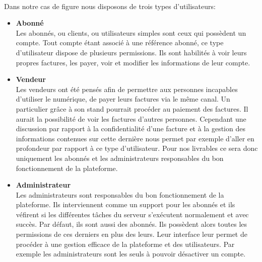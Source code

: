       \paragraph{}
      Dans notre cas de figure nous disposons de trois types d'utilisateurs:
	\begin{itemize}
	
	  \item \textbf{Abonn\'e}
	    \\Les abonn\'es, ou clients, ou utilisateurs simples sont ceux qui poss\`edent un compte. Tout compte \'etant associ\'e \`a une r\'ef\'erence abonn\'e, ce type d'utilisateur dispose de plusieurs permissions. Ils sont habilit\'es \`a voir leurs propres factures, les payer, voir et modifier les informations de leur compte.
	  
	  \item \textbf{Vendeur}
	    \\Les vendeurs ont \'et\'e pens\'es afin de permettre aux personnes incapables d'utiliser le num\'erique,  de payer leurs factures via le m\^eme canal. Un particulier gr\^ace \`a son stand pourrait proc\'eder au paiement des factures. Il aurait la possibilit\'e de voir les factures d'autres personnes. Cependant une discussion par rapport \`a la confidentialit\'e d'une facture et \`a la gestion des informations contenues sur cette derni\`ere nous permet par exemple d'aller en profondeur par rapport \`a ce type d'utilisateur. Pour nos livrables ce sera donc uniquement les abonn\'es et les administrateurs responsables du bon fonctionnement de la plateforme.
	  
	  \item \textbf{Administrateur}
	    \\Les administrateurs sont responsables du bon fonctionnement de la plateforme. Ils interviennent comme un support pour les abonn\'es et ils v\'efirent si les diff\'erentes t\^aches du serveur s'ex\'ecutent normalement et avec succ\`es. Par d\'efaut, ils sont aussi des abonn\'es. Ils poss\`edent alors toutes les permissions de ces derniers en plus des leurs. Leur interface leur permet de proc\'eder \`a une gestion efficace de la plateforme et des utilisateurs. Par exemple les administrateurs sont les seuls \`a pouvoir d\'esactiver un compte.
	
	\end{itemize}
	  
